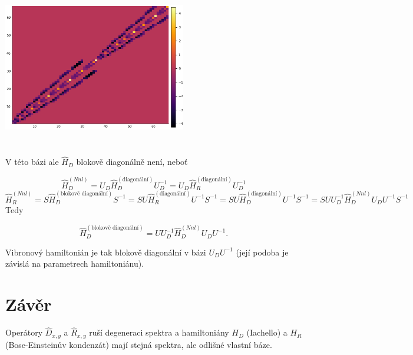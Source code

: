 \documentclass{article}
\begin{document}
    \begin{center}
        \includegraphics[width=8cm, height=7cm]{ham.png}
    \end{center}
   


    V této bázi ale $\hat{H}_D$ blokově diagonálně není, neboť

    $$\hat{H}_D^{(Nnl)} = U_D \hat{H}_D^{(\text{diagonální})} U_D^{-1} = U_D \hat{H}_R^{(\text{diagonální})} U_D^{-1} $$
    $$\hat{H}_R^{(Nnl)} = S \hat{H}_D^{(\text{blokově diagonální})} S^{-1} =  S U \hat{H}_R^{(\text{diagonální})} U^{-1} S^{-1} 
    = S U \hat{H}_D^{(\text{diagonální})} U^{-1} S^{-1}  = S U U_D^{-1} \hat{H}_D^{(Nnl)}U_D U^{-1} S^{-1} $$
Tedy 

$$\hat{H}_D^{(\text{blokově diagonální})} = U U_D^{-1} \hat{H}_D^{(Nnl)}U_D U^{-1}.$$

Vibronový hamiltonián je tak blokově diagonální v bázi $U_D U^{-1}$ (její podoba je závislá na parametrech hamiltoniánu).
    \section{Závěr}
    Operátory $\hat{D}_{x,y}$ a $\hat{R}_{x,y}$ ruší degeneraci spektra a hamiltoniány $H_D$ (Iachello) a $H_R$ (Bose-Einsteinův kondenzát)
    mají stejná spektra, ale odlišné vlastní báze. 
     
\end{document}

